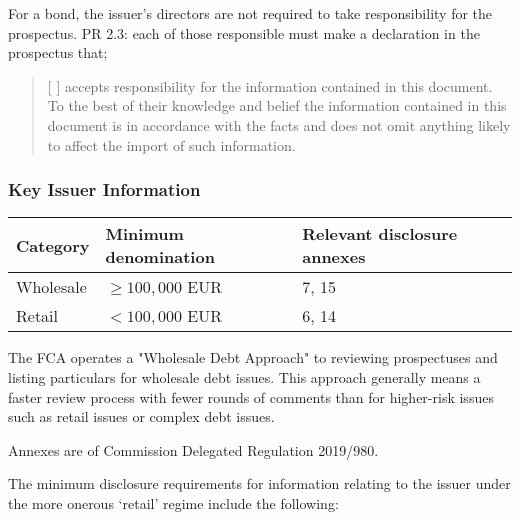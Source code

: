 \documentclass[
]{article}
\begin{document}
For a bond, the issuer's directors are not required to take
responsibility for the prospectus. PR 2.3: each of those responsible
must make a declaration in the prospectus that;

\begin{quote}
{[} {]} accepts responsibility for the information contained in this
document. To the best of their knowledge and belief the information
contained in this document is in accordance with the facts and does not
omit anything likely to affect the import of such information.
\end{quote}

\hypertarget{key-issuer-information}{%
\subsubsection{Key Issuer Information}\label{key-issuer-information}}

\begin{longtable}[]{@{}lll@{}}
\toprule()
Category & Minimum denomination & Relevant disclosure annexes \\
\midrule()
\endhead
Wholesale & {\(\geq 100,000\)} EUR & 7, 15 \\
Retail & {\(< 100,000\)} EUR & 6, 14 \\
\bottomrule()
\end{longtable}

The FCA operates a "Wholesale Debt Approach" to reviewing prospectuses
and listing particulars for wholesale debt issues. This approach
generally means a faster review process with fewer rounds of comments
than for higher-risk issues such as retail issues or complex debt
issues.

Annexes are of Commission Delegated Regulation 2019/980.

The minimum disclosure requirements for information relating to the
issuer under the more onerous `retail' regime include the following:
\end{document}

